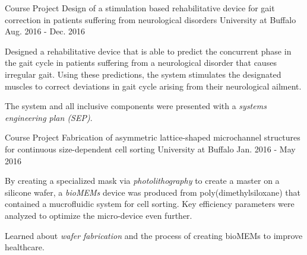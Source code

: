 

\begin{cventries}

  \cventry
    {Course Project} %
    {Design of a stimulation based rehabilitative device for gait correction in patients suffering from neurological disorders} %
    {University at Buffalo} %
    {Aug. 2016 - Dec. 2016} %
    {
      \begin{cvitems} %
        \item {Designed a rehabilitative device that is able to predict the concurrent phase in the gait cycle in patients suffering from a neurological disorder that causes irregular gait. Using these predictions, the system stimulates the designated muscles to correct deviations in gait cycle arising from their neurological ailment.}
        \item {The system and all inclusive components were presented with a \emph{systems engineering plan (SEP)}.}
      \end{cvitems}
    }
    
  \cventry
    {Course Project} %
    {Fabrication of asymmetric lattice-shaped microchannel structures for continuous size-dependent cell sorting} %
    {University at Buffalo} %
    {Jan. 2016 - May 2016} %
    {
      \begin{cvitems} %
        \item {By creating a specialized mask via \emph{photolithography} to create a master on a silicone wafer, a \emph{bioMEMs} device was produced from poly(dimethylsiloxane) that contained a mucrofluidic system for cell sorting. Key efficiency parameters were analyzed to optimize the micro-device even further.}
        \item {Learned about \emph{wafer fabrication} and the process of creating bioMEMs to improve healthcare.}
      \end{cvitems}
    }


\end{cventries}
